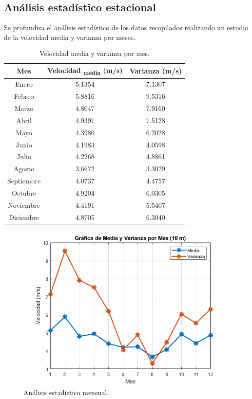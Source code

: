 \documentclass{IEEEtran}
\begin{document}
\subsection{Análisis estadístico estacional}

Se profundiza el análisis estadístico de los datos recopilados realizando un estudio de la velocidad media y varianza por meses.

\begin{table}[h]
    \centering
    \label{tab: Velocidad media y varianza por mes}
    \caption{Velocidad media y varianza por mes.}
    \begin{tabular}{|c|c|c|}
        \hline
        Mes & Velocidad \textsubscript{media} (m/s) & Varianza (m/s) \\
        \hline
        Enero & 5.1354 & 7.1307 \\
        Febreo & 5.8816 & 9.5316 \\
        Marzo & 4.8047 & 7.9160 \\
        Abril & 4.9397 & 7.5128 \\
        Mayo & 4.3980 & 6.2028 \\
        Junio & 4.1983 & 4.0598 \\
        Julio & 4.2268 & 4.8861 \\
        Agosto & 3.6672 & 3.3029 \\
        Septiembre & 4.0737 & 4.4757 \\
        Octubre & 4.9204 & 6.0305 \\
        Noviembre & 4.4191 & 5.5407 \\
        Diciembre & 4.8705 & 6.3040 \\
        \hline
    \end{tabular}
\end{table}

\begin{figure}[h]
    \centering
    \includegraphics[width = 0.5 \textwidth]{Imagenes/Grafica de Media y Varianza por Mes.png}
    \caption{Análisis estadístico mensual.}
    \label{fig: Analisis estadistico mensual}
\end{figure}
\end{document}
